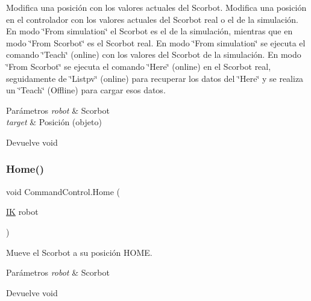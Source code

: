 Modifica una posición con los valores actuales del Scorbot. Modifica una posición en el controlador con los valores actuales del Scorbot real o el de la simulación. En modo \char`\"{}\+From simulation\char`\"{} el Scorbot es el de la simulación, mientras que en modo \char`\"{}\+From Scorbot\char`\"{} es el Scorbot real. En modo \char`\"{}\+From simulation\char`\"{} se ejecuta el comando \char`\"{}\+Teach\char`\"{} (online) con los valores del Scorbot de la simulación. En modo \char`\"{}\+From Scorbot\char`\"{} se ejecuta el comando \char`\"{}\+Here\char`\"{} (online) en el Scorbot real, seguidamente de \char`\"{}\+Listpv\char`\"{} (online) para recuperar los datos del \char`\"{}\+Here\char`\"{} y se realiza un \char`\"{}\+Teach\char`\"{} (Offline) para cargar esos datos. 
\begin{DoxyParams}{Parámetros}
{\em robot} & Scorbot \\
\hline
{\em target} & Posición (objeto) \\
\hline
\end{DoxyParams}
\begin{DoxyReturn}{Devuelve}
void 
\end{DoxyReturn}
\mbox{\label{class_command_control_adae6d4a043a93ded9d51679d78e24ce4}} 
\subsubsection{\texorpdfstring{Home()}{Home()}}
{\footnotesize\ttfamily void Command\+Control.\+Home (\begin{DoxyParamCaption}\item[{\mbox{\hyperlink{class_i_k}{IK}}}]{robot }\end{DoxyParamCaption})\hspace{0.3cm}{\ttfamily [inline]}}

Mueve el Scorbot a su posición H\+O\+ME. 
\begin{DoxyParams}{Parámetros}
{\em robot} & Scorbot \\
\hline
\end{DoxyParams}
\begin{DoxyReturn}{Devuelve}
void 
\end{DoxyReturn}
\mbox{\label{class_command_control_a150fcea4451c4cb929c0b0e2385c2698}} 
